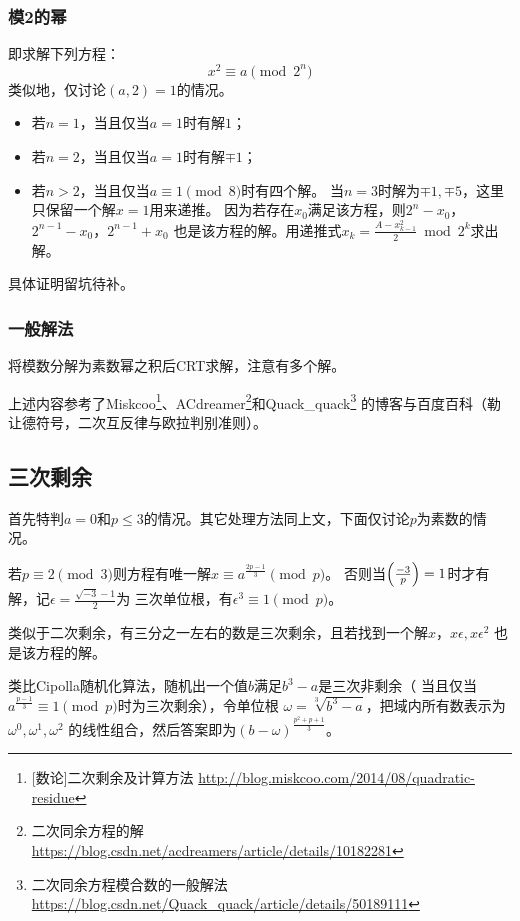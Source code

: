 \subsubsection{模2的幂}
即求解下列方程：
\begin{displaymath}
	x^2\equiv a \pmod{2^n}
\end{displaymath}
类似地，仅讨论$(a,2)=1$的情况。

\begin{itemize}
    \item 若$n=1$，当且仅当$a=1$时有解$1$；
    \item 若$n=2$，当且仅当$a=1$时有解$\mp 1$；
    \item 若$n>2$，当且仅当$a\equiv 1\pmod{8}$时有四个解。
    当$n=3$时解为$\mp 1,\mp 5$，这里只保留一个解$x=1$用来递推。
    因为若存在$x_0$满足该方程，则$2^n-x_0$，$2^{n-1}-x_0$，$2^{n-1}+x_0$
    也是该方程的解。用递推式$x_k=\frac{A -x_{k-1}^2}{2} \bmod 2^k$求出解。
\end{itemize}
具体证明留坑待补。

\subsubsection{一般解法}
将模数分解为素数幂之积后CRT求解，注意有多个解。

上述内容参考了Miskcoo\footnote{
	[数论]二次剩余及计算方法
	\url{http://blog.miskcoo.com/2014/08/quadratic-residue}
}、ACdreamer\footnote{
    二次同余方程的解
    \url{https://blog.csdn.net/acdreamers/article/details/10182281}
}和Quack\_quack\footnote{
    二次同余方程模合数的一般解法
    \url{https://blog.csdn.net/Quack\_quack/article/details/50189111}
}
的博客与百度百科（勒让德符号，二次互反律与欧拉判别准则）。
\subsection{三次剩余}
首先特判$a=0$和$p\leq 3$的情况。其它处理方法同上文，下面仅讨论$p$为素数的情况。

若$p\equiv 2 \pmod{3}$则方程有唯一解$x\equiv a^\frac{2p-1}{3} \pmod{p}$。
否则当$\left(\frac{-3}{p}\right)=1$时才有解，记$\epsilon=\frac{\sqrt{-3}-1}{2}$为
三次单位根，有$\epsilon^3\equiv 1\pmod{p}$。

类似于二次剩余，有三分之一左右的数是三次剩余，且若找到一个解$x$，$x\epsilon,x\epsilon^2$
也是该方程的解。

类比Cipolla随机化算法，随机出一个值$b$满足$b^3-a$是三次非剩余（
当且仅当$a^\frac{p-1}{3}\equiv 1\pmod{p}$时为三次剩余），令单位根
$\omega=\sqrt[3]{b^3-a}$，把域内所有数表示为$\omega^0,\omega^1,\omega^2$
的线性组合，然后答案即为$(b-\omega)^\frac{p^2+p+1}{3}$。

